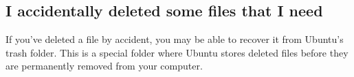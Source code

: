 






\subsection{I accidentally deleted some files that I need}

If you've deleted a file by accident, you may be able to recover it from Ubuntu's trash folder. This is a special folder where Ubuntu stores deleted files before they are permanently removed from your computer.


